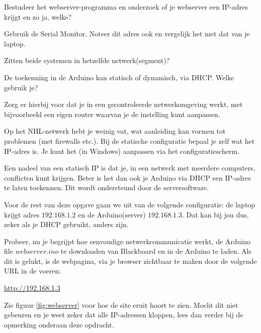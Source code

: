 \newpage
\begin{exercise}
Bestudeer het webserver-programma en onderzoek of je webserver een IP-adres krijgt en zo ja, welke? 

Gebruik de Serial Monitor. Noteer dit adres ook en vergelijk het met dat van je laptop.

Zitten beide systemen in hetzelfde netwerk(segment)?

De toekenning in de Arduino kan statisch of dynamisch, via DHCP. Welke gebruik je? 

Zorg er hierbij voor dat je in een gecontroleerde netwerkomgeving werkt, met bijvoorbeeld een eigen router waarvan je de instelling kunt aanpassen.

Op het NHL-netwerk hebt je weinig vat, wat aanleiding kan vormen tot problemen (met firewalls etc.). Bij de statische configuratie bepaal je zelf wat het IP-adres is. Je kunt het (in Windows) aanpassen via het configuratiescherm. 

Een nadeel van een statisch IP is dat je, in een netwerk met meerdere computers, conflicten kunt krijgen. Beter is het dan ook je Arduino via DHCP een IP-adres te laten toekennen. Dit wordt ondersteund door de serversoftware.
\end{exercise}

\begin{remark}
Voor de rest van deze opgave gaan we uit van de volgende configuratie: de laptop krijgt adres $192.168.1.2$ en de Arduino(server) $192.168.1.3$. Dat kan bij jou dus, zeker als je DHCP gebruikt, anders zijn.
\end{remark}

Probeer, nu je begrijpt hoe eenvoudige netwerkcommunicatie werkt, de Arduino file $webserver.ino$ te downloaden van Blackboard en in de Arduino te laden. Als dit is gelukt, is de webpagina, via je browser zichtbaar te maken door de volgende URL in de voeren:

\url{http://192.168.1.3}

Zie figuur \ref{fig:webserver} voor hoe de site eruit hoort te zien. Mocht dit niet gebeuren en je weet zeker dat alle IP-adressen kloppen, lees dan verder bij de opmerking onderaan deze opdracht.

